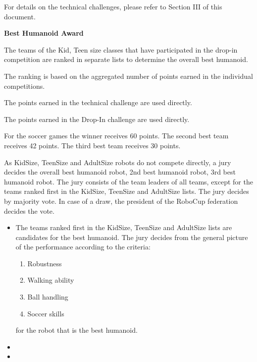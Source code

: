 For details on the technical challenges, please refer to Section III of this document.

\bigskip

{\bfseries Best Humanoid Award}

\headlinebox
 
The teams  of the Kid, Teen  size classes that have participated in the drop-in competition are ranked in separate lists to determine the overall best humanoid.

The ranking is based on the aggregated number of points earned in the individual competitions.

\bigskip

The points earned in the technical challenge are used directly.

\bigskip

The points earned in the Drop-In challenge are used directly.

\bigskip

For the soccer games the winner receives 60 points. The second best team receives 42 points. The third best team receives 30 points.

\bigskip

As KidSize, TeenSize and AdultSize robots do not compete directly, a jury decides the overall best humanoid robot, 2nd best humanoid robot, 3rd best humanoid robot. The jury consists of the team leaders of all teams, except for the teams ranked first in the KidSize, TeenSize and AdultSize lists. The jury decides by majority vote. In case of a draw, the president of the RoboCup federation decides the vote.

\begin{itemize}
\item The teams ranked first in the KidSize, TeenSize and AdultSize lists are candidates for the best humanoid. The jury decides from the general picture of the performance according to the criteria:
\begin{enumerate}
\item Robustness
\item Walking ability
\item Ball handling
\item Soccer skills
\end{enumerate}
for the robot that is the best humanoid.
\item {} 
\item {} 
\end{itemize}

